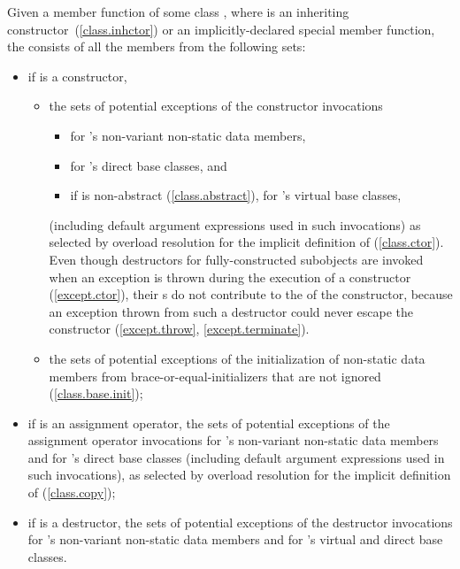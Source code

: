 \pnum
Given a member function  of some class , where  is
an inheriting constructor~(\ref{class.inhctor}) or an implicitly-declared special
member function,
the  
consists of all the members from the following sets:

\begin{itemize}
\item
if  is a constructor,
\begin{itemize}
\item
the sets of potential exceptions of the constructor invocations
\begin{itemize}
\item
for 's non-variant non-static data members,
\item
for 's direct base classes, and
\item
if  is non-abstract (\ref{class.abstract}), for 's virtual base
classes,
\end{itemize}
(including default argument expressions used in such invocations) as selected
by overload resolution for the implicit definition of  (\ref{class.ctor}).
\enternote
Even though destructors for fully-constructed subobjects are invoked
when an exception is thrown during the execution of a constructor (\ref{except.ctor}), their s do not contribute to the
 of the constructor, because
an exception thrown from such a destructor could never escape the constructor
(\ref{except.throw}, \ref{except.terminate}).
\exitnote
\item
the sets of potential exceptions of the initialization of non-static data members
from brace-or-equal-initializers that are not ignored (\ref{class.base.init});
\end{itemize}

\item
if  is an assignment operator, the sets of potential exceptions of
the assignment operator invocations for 's non-variant non-static
data members and for 's direct base classes (including default
argument expressions used in such invocations), as selected by overload resolution
for the implicit definition of  (\ref{class.copy});

\item
if  is a destructor, the sets of potential exceptions of the
destructor invocations for 's non-variant non-static data members
and for 's virtual and direct base classes.
\end{itemize}

